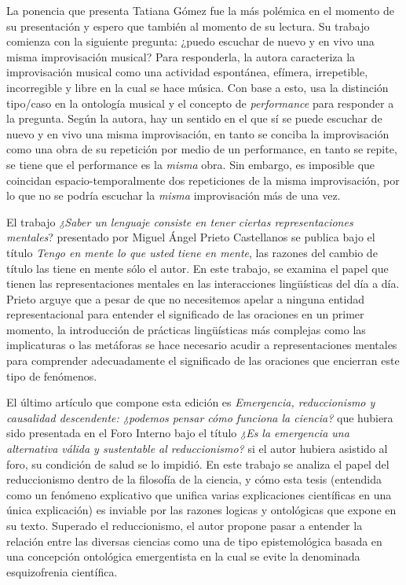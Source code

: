 \documentclass[]{book}
\begin{document}
La ponencia que presenta Tatiana Gómez fue la más polémica en el momento
de su presentación y espero que también al momento de su lectura. Su
trabajo comienza con la siguiente pregunta: ¿puedo escuchar de nuevo y
en vivo una misma improvisación musical? Para responderla, la autora
caracteriza la improvisación musical como una actividad espontánea,
efímera, irrepetible, incorregible y libre en la cual se hace música.
Con base a esto, usa la distinción tipo/caso en la ontología musical y
el concepto de \emph{performance} para responder a la pregunta. Según la
autora, hay un sentido en el que sí se puede escuchar de nuevo y en vivo
una misma improvisación, en tanto se conciba la improvisación como una
obra de su repetición por medio de un performance, en tanto se repite,
se tiene que el performance es la \emph{misma} obra. Sin embargo, es
imposible que coincidan espacio-temporalmente dos repeticiones de la
misma improvisación, por lo que no se podría escuchar la \emph{misma}
improvisación más de una vez.

El trabajo \emph{¿Saber un lenguaje consiste en tener ciertas
representaciones mentales}? presentado por Miguel Ángel Prieto
Castellanos se publica bajo el título \emph{Tengo en mente lo que usted
tiene en mente}, las razones del cambio de título las tiene en mente
sólo el autor. En este trabajo, se examina el papel que tienen las
representaciones mentales en las interacciones lingüísticas del día a
día. Prieto arguye que a pesar de que no necesitemos apelar a ninguna
entidad representacional para entender el significado de las oraciones
en un primer momento, la introducción de prácticas lingüísticas más
complejas como las implicaturas o las metáforas se hace necesario acudir
a representaciones mentales para comprender adecuadamente el significado
de las oraciones que encierran este tipo de fenómenos.

El último artículo que compone esta edición es \emph{Emergencia,
reduccionismo y causalidad descendente: ¿podemos pensar cómo funciona la
ciencia?} que hubiera sido presentada en el Foro Interno bajo el título
\emph{¿Es la emergencia una alternativa válida y sustentable al
reduccionismo?} si el autor hubiera asistido al foro, su condición de
salud se lo impidió. En este trabajo se analiza el papel del
reduccionismo dentro de la filosofía de la ciencia, y cómo esta tesis
(entendida como un fenómeno explicativo que unifica varias explicaciones
científicas en una única explicación) es inviable por las razones
logicas y ontológicas que expone en su texto. Superado el reduccionismo,
el autor propone pasar a entender la relación entre las diversas
ciencias como una de tipo epistemológica basada en una concepción
ontológica emergentista en la cual se evite la denominada esquizofrenia
científica.
\end{document}
